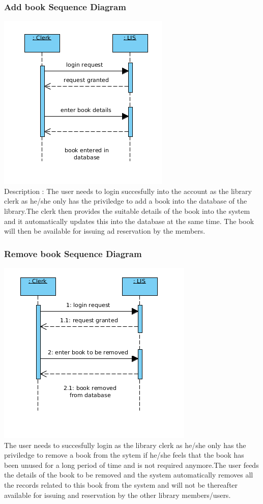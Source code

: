 \documentclass[a4paper]{article}
\begin{document}
\subsubsection*{Add book Sequence Diagram}
\includegraphics[scale=0.50]{images/seqDiagAddBook.png}
\\
Description : The user needs to login succesfully into the account as the library clerk as he/she only has the priviledge to add a book into the database of the library.The clerk then provides the suitable details of the book into the system and it automatically updates this into the database at the same time. The book will then be available for issuing ad reservation by the members.
\\

\subsubsection*{Remove book Sequence Diagram}
\includegraphics[scale=0.50]{images/seqDiagBookRemoval.png}
\\
The user needs to succesfully login as the library clerk as he/she only has the priviledge to remove a book from the sytem if he/she feels that the book has been unused for a long period of time and is not required anymore.The user feeds the details of the book to be removed and the system automatically removes all the records related to this book from the system and will not be thereafter available for issuing and reservation by the other library members/users.
\\
\end{document}

